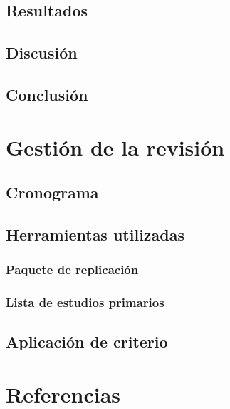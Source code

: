 \documentclass{article}
\begin{document}
\subsection{Resultados}
\subsection{Discusión}
\subsection{Conclusión}
\section{Gestión de la revisión}
\subsection{Cronograma}
\subsection{Herramientas utilizadas}
\subsubsection{Paquete de replicación}
\subsubsection{Lista de estudios primarios}
\subsection{Aplicación de criterio}
\section{Referencias}
\end{document}

